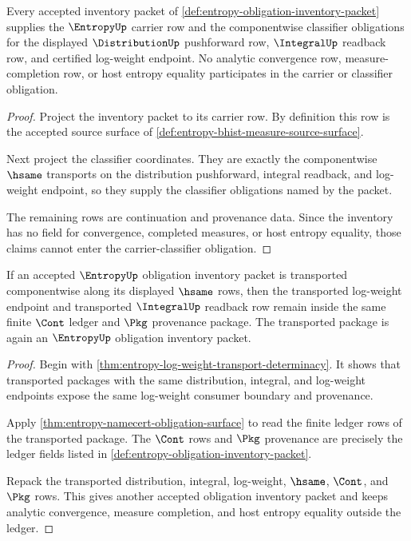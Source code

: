 \begin{theorem}
\label{thm:entropy-carrier-classifier-obligation}
Every accepted inventory packet of
\autoref{def:entropy-obligation-inventory-packet} supplies the $\EntropyUp$
carrier row and the componentwise classifier obligations for the displayed
$\DistributionUp$ pushforward row, $\IntegralUp$ readback row, and certified
log-weight endpoint. No analytic convergence row, measure-completion row, or
host entropy equality participates in the carrier or classifier obligation.
\end{theorem}
\begin{proof}
Project the inventory packet to its carrier row. By definition this row is the
accepted source surface of \autoref{def:entropy-bhist-measure-source-surface}.

Next project the classifier coordinates. They are exactly the componentwise
$\hsame$ transports on the distribution pushforward, integral readback, and
log-weight endpoint, so they supply the classifier obligations named by the
packet.

The remaining rows are continuation and provenance data. Since the inventory has
no field for convergence, completed measures, or host entropy equality, those
claims cannot enter the carrier-classifier obligation.
\end{proof}

\begin{theorem}
\label{thm:entropy-ledger-stability-obligation}
If an accepted $\EntropyUp$ obligation inventory packet is transported
componentwise along its displayed $\hsame$ rows, then the transported
log-weight endpoint and transported $\IntegralUp$ readback row remain inside the
same finite $\Cont$ ledger and $\Pkg$ provenance package. The transported
package is again an $\EntropyUp$ obligation inventory packet.
\end{theorem}
\begin{proof}
Begin with \autoref{thm:entropy-log-weight-transport-determinacy}. It shows that
transported packages with the same distribution, integral, and log-weight
endpoints expose the same log-weight consumer boundary and provenance.

Apply \autoref{thm:entropy-namecert-obligation-surface} to read the finite
ledger rows of the transported package. The $\Cont$ rows and $\Pkg$ provenance
are precisely the ledger fields listed in
\autoref{def:entropy-obligation-inventory-packet}.

Repack the transported distribution, integral, log-weight, $\hsame$, $\Cont$,
and $\Pkg$ rows. This gives another accepted obligation inventory packet and
keeps analytic convergence, measure completion, and host entropy equality
outside the ledger.
\end{proof}

